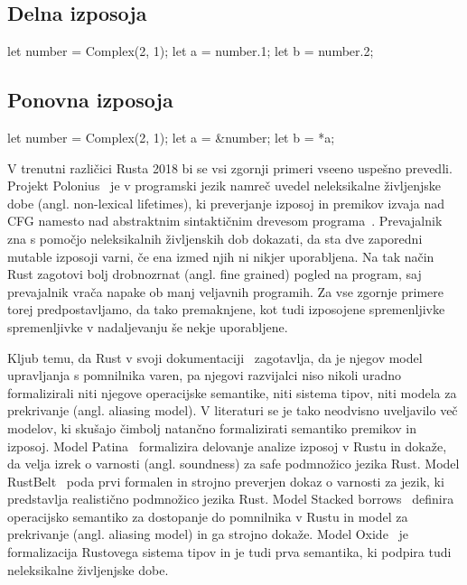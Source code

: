 \subsection{Delna izposoja}

\begin{rust-success}
let number = Complex(2, 1);
let a = number.1;
let b = number.2;
\end{rust-success}

\subsection{Ponovna izposoja}

\begin{rust-success}
let number = Complex(2, 1);
let a = &number;
let b = *a;
\end{rust-success}

V trenutni različici Rusta 2018 bi se vsi zgornji primeri vseeno uspešno prevedli. Projekt Polonius~\cite{Matsakis_2018, Matsakis_et_al_2022} je v programski jezik namreč uvedel neleksikalne življenjske dobe (angl. non-lexical lifetimes), ki preverjanje izposoj in premikov izvaja nad CFG namesto nad abstraktnim sintaktičnim drevesom programa~\cite{Oxide, StackedBorrows}. Prevajalnik zna s pomočjo neleksikalnih življenskih dob dokazati, da sta dve zaporedni mutable izposoji varni, če ena izmed njih ni nikjer uporabljena. Na tak način Rust zagotovi bolj drobnozrnat (angl. fine grained) pogled na program, saj prevajalnik vrača napake ob manj veljavnih programih. Za vse zgornje primere torej predpostavljamo, da tako premaknjene, kot tudi izposojene spremenljivke spremenljivke v nadaljevanju še nekje uporabljene.

Kljub temu, da Rust v svoji dokumentaciji~\cite{klabnik2023rust} zagotavlja, da je njegov model upravljanja s pomnilnika varen, pa njegovi razvijalci niso nikoli uradno formalizirali niti njegove operacijske semantike, niti sistema tipov, niti modela za prekrivanje (angl. aliasing model). V literaturi se je tako neodvisno uveljavilo več modelov, ki skušajo čimbolj natančno formalizirati semantiko premikov in izposoj. Model Patina~\cite{reed2015patina} formalizira delovanje analize izposoj v Rustu in dokaže, da velja izrek o varnosti (angl. soundness) za safe podmnožico jezika Rust. Model RustBelt~\cite{10.1145/3158154} poda prvi formalen in strojno preverjen dokaz o varnosti za jezik, ki predstavlja realistično podmnožico jezika Rust. Model Stacked borrows~\cite{StackedBorrows} definira operacijsko semantiko za dostopanje do pomnilnika v Rustu in model za prekrivanje (angl. aliasing model) in ga strojno dokaže. Model Oxide~\cite{Oxide} je formalizacija Rustovega sistema tipov in je tudi prva semantika, ki podpira tudi neleksikalne življenjske dobe. 